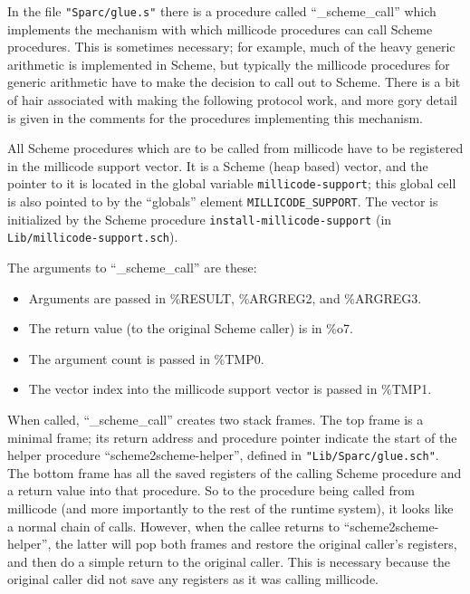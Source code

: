 In the file \verb+"Sparc/glue.s"+ there is a procedure called 
``\_scheme\_call'' which implements the mechanism with which millicode 
procedures can call Scheme procedures. This is sometimes necessary; for
example, much of the heavy generic arithmetic is implemented in Scheme, 
but typically the millicode procedures for generic arithmetic have to
make the decision to call out to Scheme. There is a bit of hair
associated with making the following protocol work, and more gory
detail is given in the comments for the procedures implementing this
mechanism.

All Scheme procedures which are to be called from millicode have to be
registered in the millicode support vector.  It is a Scheme (heap
based) vector, and the pointer to it is located in the global variable
\verb+millicode-support+; this global cell is also pointed to by the 
``globals'' element \verb+MILLICODE_SUPPORT+. The vector is
initialized by the Scheme procedure \verb+install-millicode-support+
(in \verb+Lib/millicode-support.sch+). 

The arguments to ``\_scheme\_call'' are these:

\begin{itemize}
\parskip 0in
\item Arguments are passed in \%RESULT, \%ARGREG2, and \%ARGREG3.
\item The return value (to the original Scheme caller) is in \%o7.
\item The argument count is passed in \%TMP0.
\item The vector index into the millicode support vector is passed in \%TMP1.
\end{itemize}

When called, ``\_scheme\_call'' creates two stack frames. The top frame is
a minimal frame; its return address and procedure pointer indicate the start
of the helper procedure ``scheme2scheme-helper'', defined in 
\verb+"Lib/Sparc/glue.sch"+. The bottom frame has all the saved registers
of the calling Scheme procedure and a return value into that procedure.
So to the procedure being called from millicode (and more importantly to
the rest of the runtime system), it looks like a normal chain of calls.
However, when the callee returns to ``scheme2scheme-helper'', the latter will
pop both frames and restore the original caller's registers, and then do a
simple return to the original caller. This is necessary because the original
caller did not save any registers as it was calling millicode.


